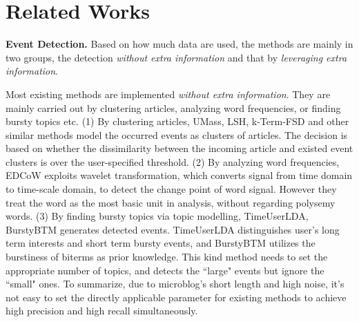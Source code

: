 \documentclass[runningheads,a4paper]{llncs}
\theoremstyle{exampstyle}
\begin{document}
\section{Related Works}
\label{sec:relatedWorks}
\textbf{Event Detection.} Based on how much data are used, the methods are mainly in two groups, the detection \textit{without extra information} and that by \textit{leveraging extra information}. 

Most existing methods are implemented \textit{without extra information}.
They are mainly carried out by clustering articles\cite{Allan:2000wu,Petrovic:2010uj,Wurzer:2015wq}, analyzing word frequencies\cite{Mathioudakis:2010fc,Weng:2011wz}, or finding bursty topics\cite{Diao:2012wj,Yan:2015wm} etc. 
(1) By clustering articles, UMass\cite{Allan:2000wu}, LSH\cite{Petrovic:2010uj}, k-Term-FSD\cite{Wurzer:2015wq} and other similar methods model the occurred events as clusters of articles.
The decision is based on whether the dissimilarity between the incoming article and existed event clusters is over the user-specified threshold. 
(2) By analyzing word frequencies, EDCoW\cite{Weng:2011wz} exploits wavelet transformation, which converts signal from time domain to time-scale domain, to detect the change point of word signal. 
However they treat the word as the most basic unit in analysis, without regarding polysemy words.
(3) By finding bursty topics via topic modelling, TimeUserLDA\cite{Diao:2012wj}, BurstyBTM\cite{Yan:2015wm} generates detected events.
TimeUserLDA distinguishes user's long term interests and short term bursty events, and BurstyBTM utilizes the burstiness of biterms as prior knowledge.
This kind method needs to set the appropriate number of topics, and detects the ``large" events but ignore the ``small" ones. 
To summarize, due to microblog's short length and high noise, it's not easy to set the directly applicable parameter for existing methods to achieve high precision and high recall simultaneously.
\end{document}
